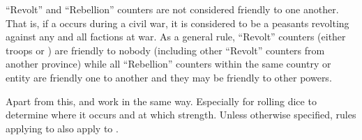 \aparag ``Revolt'' and ``Rebellion'' counters are not considered
friendly to one another. That is, if a \RD occurs during a civil war, it
is considered to be a peasants revolting against any and all factions at
war.
\bparag As a general rule, ``Revolt'' counters (either troops or
\REVOLT) are friendly to nobody (including other ``Revolt'' counters
from another province) while all ``Rebellion'' counters within the same
country or entity are friendly one to another and they may be friendly
to other powers.

\aparag Apart from this, \REVOLT and \REBELLION work in the same
way. Especially for rolling dice to determine where it occurs and at
which strength.
\bparag Unless otherwise specified, rules applying to \REVOLT also apply
to \REBELLION.



